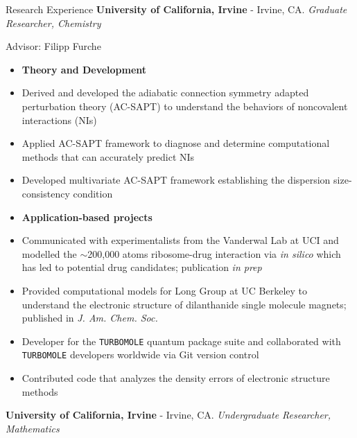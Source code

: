 \begin{rubric}{Research Experience}
  \textbf{University of California, Irvine} - Irvine, CA.
  \textit{Graduate Researcher, Chemistry}
  
  Advisor: Filipp Furche
  \vspace{-0.5em}
  \begin{itemize}
    \itemsep-0.5em
  \item[] \hspace{-0.33in}\textbf{Theory and Development}
  \item Derived and developed the adiabatic connection symmetry adapted perturbation theory
    (AC-SAPT) to understand the behaviors of noncovalent interactions (NIs)
  \item Applied AC-SAPT framework to diagnose and determine computational methods that can accurately
    predict NIs
  \item Developed multivariate AC-SAPT framework establishing the dispersion
    size-consistency condition
  \item[] \hspace{-0.33in}\textbf{Application-based projects}
  \item Communicated with experimentalists from the Vanderwal Lab at UCI and modelled
    the $\sim$200,000 atoms ribosome-drug interaction via \textit{in silico} which has led to
    potential drug candidates; publication \textit{in prep}
  \item Provided computational models for Long Group at UC Berkeley to understand the
    electronic structure of dilanthanide single molecule magnets; published in \textit{J. Am. Chem. Soc.}
  \item Developer for the \texttt{TURBOMOLE} quantum package suite and collaborated with \texttt{TURBOMOLE}
    developers worldwide via Git version control
  \item Contributed code that analyzes the density errors of electronic structure methods
  \end{itemize}
  \textbf{University of California, Irvine} - Irvine, CA.
  \textit{Undergraduate Researcher, Mathematics}


\end{rubric}
